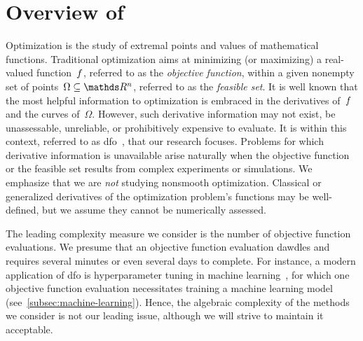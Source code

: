 \section{Overview of }

Optimization is the study of extremal points and values of mathematical functions.
Traditional optimization aims at minimizing (or maximizing) a real-valued function~$f$, referred to as the \emph{objective function}, within a given nonempty set of points~$\Omega \subseteq \R^n$, referred to as the \emph{feasible set}.
It is well known that the most helpful information to optimization is embraced in the derivatives of~$f$ and the curves of~$\Omega$.
However, such derivative information may not exist, be unassessable, unreliable, or prohibitively expensive to evaluate.
It is within this context, referred to as \gls{dfo}~\cite{Audet_Hare_2017,Conn_Scheinberg_Vicente_2009b}, that our research focuses.
Problems for which derivative information is unavailable arise naturally when the objective function or the feasible set results from complex experiments or simulations.
We emphasize that we are \emph{not} studying nonsmooth optimization.
Classical or generalized derivatives of the optimization problem's functions may be well-defined, but we assume they cannot be numerically assessed.

The leading complexity measure we consider is the number of objective function evaluations.
We presume that an objective function evaluation dawdles and requires several minutes or even several days to complete.
For instance, a modern application of \gls{dfo} is hyperparameter tuning in machine learning~\cite{Ghanbari_Scheinberg_2017}, for which one objective function evaluation necessitates training a machine learning model (see~\cref{subsec:machine-learning}).
Hence, the algebraic complexity of the methods we consider is not our leading issue, although we will strive to maintain it acceptable.


